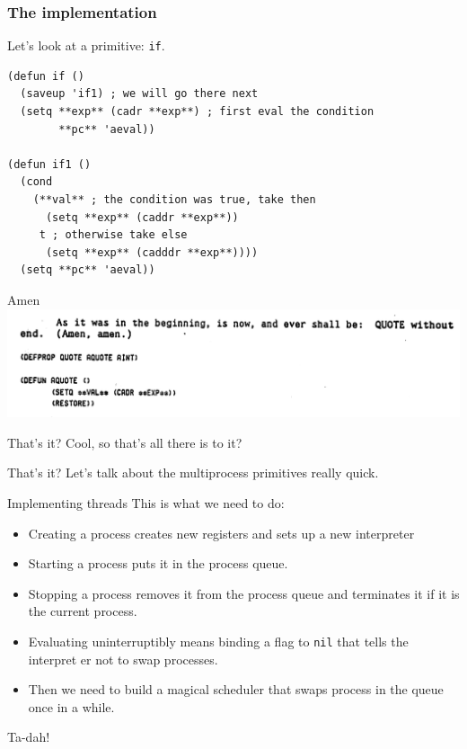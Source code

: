 \documentclass[aspectratio=169]{beamer}
\begin{document}
  \begin{frame}[fragile]
    \frametitle{The implementation}
    Let’s look at a primitive: \texttt{if}.

    \begin{listing}[H]
      \caption{The internals of \texttt{if}.}
      \begin{verbatim}
(defun if ()
  (saveup 'if1) ; we will go there next
  (setq **exp** (cadr **exp**) ; first eval the condition
        **pc** 'aeval))

(defun if1 ()
  (cond
    (**val** ; the condition was true, take then
      (setq **exp** (caddr **exp**))
     t ; otherwise take else
      (setq **exp** (cadddr **exp**))))
  (setq **pc** 'aeval))
      \end{verbatim}
    \end{listing}
  \end{frame}
  \begin{frame}{Amen}
    \includegraphics[width=14cm]{amen.png}
  \end{frame}
  \begin{frame}{That’s it?}
    Cool, so that’s all there is to it?
  \end{frame}
  \begin{frame}{That’s it?}
    Let’s talk about the multiprocess primitives really quick.
  \end{frame}
  \begin{frame}{Implementing threads}
    This is what we need to do:

    \begin{itemize}
      \item Creating a process creates new registers and sets up a new interpreter
      \item Starting a process puts it in the process queue.
      \item Stopping a process removes it from the process queue and terminates it if it is the current process.
      \item Evaluating uninterruptibly means binding a flag to \texttt{nil} that tells the interpret er not to swap processes.
      \item Then we need to build a magical scheduler that swaps process in the queue once in a while.
    \end{itemize}

    Ta-dah!
  \end{frame}
\end{document}
